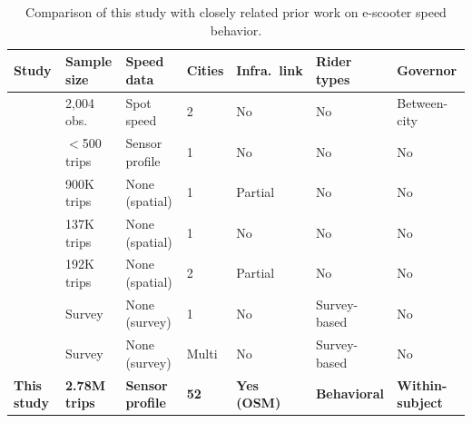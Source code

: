 \begin{table}[htbp]
\centering
\caption{Comparison of this study with closely related prior work on e-scooter speed behavior.}
\label{tab:lit_comparison}
\small
\begin{tabular}{p{2.8cm}p{1.5cm}p{1.5cm}p{1.2cm}p{1.2cm}p{1.2cm}p{1.2cm}}
\toprule
\textbf{Study} & \textbf{Sample size} & \textbf{Speed data} & \textbf{Cities} & \textbf{Infra.\ link} & \textbf{Rider types} & \textbf{Governor} \\
\midrule
\citet{cicchino2023speed} & 2,004 obs. & Spot speed & 2 & No & No & Between-city \\
\citet{ma2021escooter} & $<$500 trips & Sensor profile & 1 & No & No & No \\
\citet{jiao2020shared} & 900K trips & None (spatial) & 1 & Partial & No & No \\
\citet{mckenzie2019spatiotemporal} & 137K trips & None (spatial) & 1 & No & No & No \\
\citet{bai2020dockless} & 192K trips & None (spatial) & 2 & Partial & No & No \\
\citet{degele2018identifying} & Survey & None (survey) & 1 & No & Survey-based & No \\
\citet{jena2025latent} & Survey & None (survey) & Multi & No & Survey-based & No \\
\addlinespace
\textbf{This study} & \textbf{2.78M trips} & \textbf{Sensor profile} & \textbf{52} & \textbf{Yes (OSM)} & \textbf{Behavioral} & \textbf{Within-subject} \\
\bottomrule
\end{tabular}
\end{table}
